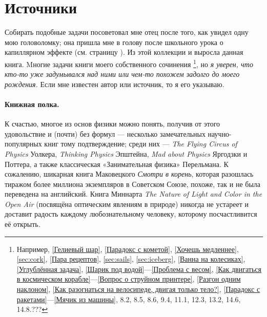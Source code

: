 \section{Источники}

Собирать подобные задачи посоветовал мне отец после того, как увидел одну мою головоломку;
она пришла мне в голову после школьного урока о капиллярном эффекте (см. страницу \pageref{???}).
Из этой коллекции и выросла данная книга.
Mногие задачи книги моего собственного сочинения%
\footnote{Например,
\ref{Гелиевый шар}, \ref{Парадокс с кометой}, \ref{Хочешь медленнее},
\ref{sec:cork}, \ref{Пара рецептов}, \ref{sec:sails}, \ref{sec:iceberg},
\ref{Ванна на колесиках}, \ref{Углублённая задача}, \ref{Шарик под водой}---\ref{Проблема с весом},
\ref{Как двигаться в космическом корабле}---\ref{Вопрос о струйном принтере},
\ref{Разгон одним наклоном}, \ref{Как разогнаться на велосипеде, двигая только тело?}, \ref{Парадокс с ракетами}---\ref{Мячик из машины},
8.2, 8.5, 8.6,
9.4,
11.1,
12.3,
13.2,
14.6, 14.8.???
}, но \emph{я уверен, что кто-то уже задумывался над ними или чем-то похожем задолго до моего рождения.}
Если мне известен автор или источник, то я его указываю.

\paragraph{Книжная полка.}
К счастью, %
многое из основ физики можно понять, получив от этого удовольствие и (почти) без формул ---
несколько замечательных научно-популярных книг тому подтверждение;
среди них — \emph{The Flying Circus of Physics} Уолкера,
\emph{Thinking Physics} Эпштейна,
\emph{Mad about Physics} Яргодзки и Поттера,
а также классическая «Занимательная физика» Перельмана.
К сожалению, шикарная книга Маковецкого \emph{Смотри в корень}, которая разошлась тиражом более миллиона экземпляров в Советском Союзе, похоже, так и не была переведена на английский.
Книга Миннарта \emph{The Nature of Light and Color in the Open Air} (посвящёна оптическим явлениям в природе) никогда не устареет и доставит радость каждому любознательному человеку, которому посчастливится её открыть.
